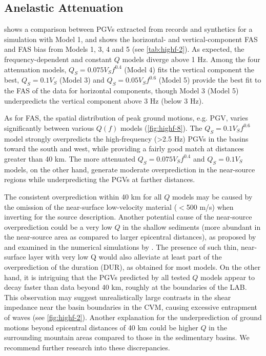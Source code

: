 \subsection{Anelastic Attenuation}\label{highf:qf}
 shows a comparison between PGVs extracted from records and synthetics for a simulation with Model 1, and
 shows the horizontal- and vertical-component FAS and FAS bias from Models 1, 3, 4 and 5 (see \cref{tab:highf-2}). As expected, the frequency-dependent and constant $Q$ models diverge above 1 Hz. Among the four attenuation models, $Q_S=0.075V_Sf^{0.4}$ (Model 4) fits the vertical component the best, $Q_S=0.1V_S$ (Model 3) and $Q_S=0.05V_Sf^{0.6}$ (Model 5) provide the best fit to the FAS of the data for horizontal components, though Model 3 (Model 5) underpredicts the vertical component above 3 Hz (below 3 Hz). 

As for FAS, the spatial distribution of peak ground motions, e.g. PGV, varies significantly between various $Q(f)$ models (\cref{fig:highf-8}). The $Q_S=0.1V_Sf^{0.6}$ model strongly overpredicts the high-frequency (>2.5 Hz) PGVs in the basins toward the south and west, while providing a fairly good match at distances greater than 40 km. The more attenuated $Q_S=0.075V_Sf^{0.4}$ and $Q_S=0.1V_S$ models, on the other hand, generate moderate overprediction in the near-source regions while underpredicting the PGVs at farther distances. 

The consistent overprediction within 40 km for all $Q$ models may be caused by the omission of the near-surface low-velocity material ($<$500 m/s) when inverting for the source description. Another potential cause of the near-source overprediction could be a very low $Q$ in the shallow sediments (more abundant in the near-source area as compared to larger epicentral distances), as proposed by \citet{houghAttenuationAnzaCalifornia1988} and examined in the numerical simulations by \citet{withersGroundMotionIntraevent2019}. The presence of such thin, near-surface layer with very low Q would also alleviate at least part of the overprediction of the duration (DUR), as obtained for most models. On the other hand, it is intriguing that the PGVs predicted by all tested $Q$ models appear to decay faster than data beyond 40 km, roughly at the boundaries of the LAB. This observation may suggest unrealistically large contrasts in the shear impedance near the basin boundaries in the CVM, causing excessive entrapment of waves (see \cref{fig:highf-2}). Another explanation for the underprediction of ground motions beyond epicentral distances of 40 km could be higher $Q$ in the surrounding mountain areas compared to those in the sedimentary basins. We recommend further research into these discrepancies.

